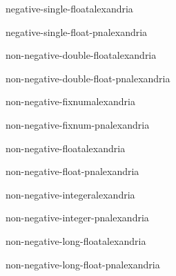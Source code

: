 \begin{type}{negative-single-float}{}{alexandria}{}
  
\end{type}

\begin{function}{negative-single-float-p}{n}{alexandria}{}
  
\end{function}

\begin{type}{non-negative-double-float}{}{alexandria}{}
  
\end{type}

\begin{function}{non-negative-double-float-p}{n}{alexandria}{}
  
\end{function}

\begin{type}{non-negative-fixnum}{}{alexandria}{}
  
\end{type}

\begin{function}{non-negative-fixnum-p}{n}{alexandria}{}
  
\end{function}

\begin{type}{non-negative-float}{}{alexandria}{}
  
\end{type}

\begin{function}{non-negative-float-p}{n}{alexandria}{}
  
\end{function}

\begin{type}{non-negative-integer}{}{alexandria}{}
  
\end{type}

\begin{function}{non-negative-integer-p}{n}{alexandria}{}
  
\end{function}

\begin{type}{non-negative-long-float}{}{alexandria}{}
  
\end{type}

\begin{function}{non-negative-long-float-p}{n}{alexandria}{}
  
\end{function}

